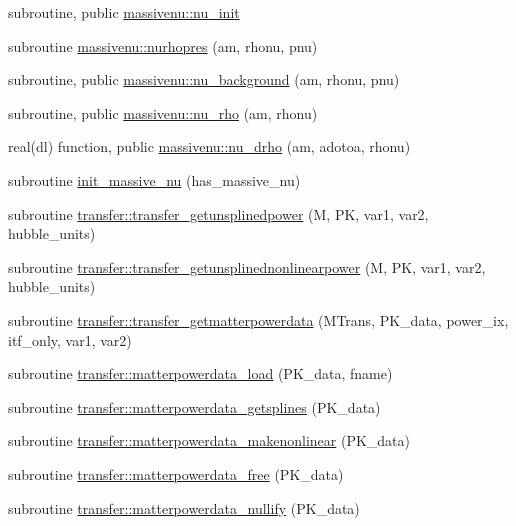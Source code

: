 \begin{DoxyCompactItemize}
\item 
subroutine, public \mbox{\hyperlink{namespacemassivenu_acf78f8f20c4f8c680d7f239aaffbc826}{massivenu\+::nu\+\_\+init}}
\item 
subroutine \mbox{\hyperlink{namespacemassivenu_ae38eedf1b14513e212f542f0afcb8a7f}{massivenu\+::nurhopres}} (am, rhonu, pnu)
\item 
subroutine, public \mbox{\hyperlink{namespacemassivenu_a30a55d3fc963ae76797cb114a3bd8818}{massivenu\+::nu\+\_\+background}} (am, rhonu, pnu)
\item 
subroutine, public \mbox{\hyperlink{namespacemassivenu_a5e5e907b67a43f82b29065f75a696ae5}{massivenu\+::nu\+\_\+rho}} (am, rhonu)
\item 
real(dl) function, public \mbox{\hyperlink{namespacemassivenu_a095ca5fb68fcb4e3b808e4dcf0f2f34d}{massivenu\+::nu\+\_\+drho}} (am, adotoa, rhonu)
\item 
subroutine \mbox{\hyperlink{modules_8f90_aeb341c03133755d1152435fb5558adfb}{init\+\_\+massive\+\_\+nu}} (has\+\_\+massive\+\_\+nu)
\item 
subroutine \mbox{\hyperlink{namespacetransfer_af736a104130d0ba0ffbadfa62d245747}{transfer\+::transfer\+\_\+getunsplinedpower}} (M, PK, var1, var2, hubble\+\_\+units)
\item 
subroutine \mbox{\hyperlink{namespacetransfer_a8690f3749fa31715c7729f1f934b7d91}{transfer\+::transfer\+\_\+getunsplinednonlinearpower}} (M, PK, var1, var2, hubble\+\_\+units)
\item 
subroutine \mbox{\hyperlink{namespacetransfer_a149c7870c28cd849591073c3d8f76d69}{transfer\+::transfer\+\_\+getmatterpowerdata}} (M\+Trans, P\+K\+\_\+data, power\+\_\+ix, itf\+\_\+only, var1, var2)
\item 
subroutine \mbox{\hyperlink{namespacetransfer_af9f31cacfbd0270f60f1c42a0b38dd62}{transfer\+::matterpowerdata\+\_\+load}} (P\+K\+\_\+data, fname)
\item 
subroutine \mbox{\hyperlink{namespacetransfer_ad195947cd911f4aef6edba0319f4ac2f}{transfer\+::matterpowerdata\+\_\+getsplines}} (P\+K\+\_\+data)
\item 
subroutine \mbox{\hyperlink{namespacetransfer_a113eb04b73dbf4222ca5a7e88eea5528}{transfer\+::matterpowerdata\+\_\+makenonlinear}} (P\+K\+\_\+data)
\item 
subroutine \mbox{\hyperlink{namespacetransfer_aca3eef4bfa07144ae4db1ec793e42c70}{transfer\+::matterpowerdata\+\_\+free}} (P\+K\+\_\+data)
\item 
subroutine \mbox{\hyperlink{namespacetransfer_a890cb72b18bbeb6b973f55ac477250e2}{transfer\+::matterpowerdata\+\_\+nullify}} (P\+K\+\_\+data)

\end{DoxyCompactItemize}
